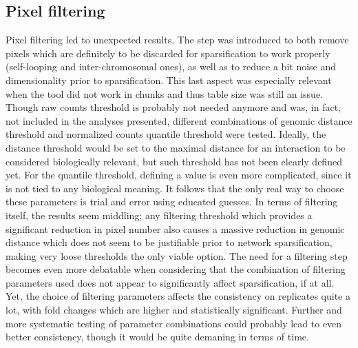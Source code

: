 \subsection{Pixel filtering}
Pixel filtering led to unexpected results. The step was introduced to both remove pixels which are definitely to be discarded for sparsification to work properly (self-looping and inter-chromosomal ones), as well as to reduce a bit noise and dimensionality prior to sparsification. This last aspect was especially relevant when the tool did not work in chunks and thus table size was still an issue. Though raw counts threshold is probably not needed anymore and was, in fact, not included in the analyses presented, different combinations of genomic distance threshold and normalized counts quantile threshold were tested. Ideally, the distance threshold would be set to the maximal distance for an interaction to be considered biologically relevant, but such threshold has not been clearly defined yet. For the quantile threshold, defining a value is even more complicated, since it is not tied to any biological meaning. It follows that the only real way to choose these parameters is trial and error using educated guesses. In terms of filtering itself, the results seem middling; any filtering threshold which provides a significant reduction in pixel number also causes a massive reduction in genomic distance which does not seem to be justifiable prior to network sparsification, making very loose thresholds the only viable option. The need for a filtering step becomes even more debatable when considering that the combination of filtering parameters used does not appear to significantly affect sparsification, if at all. Yet, the choice of filtering parameters affects the consistency on replicates quite a lot, with fold changes which are higher and statistically significant. Further and more systematic testing of parameter combinations could probably lead to even better consistency, though it would be quite demaning in terms of time.

